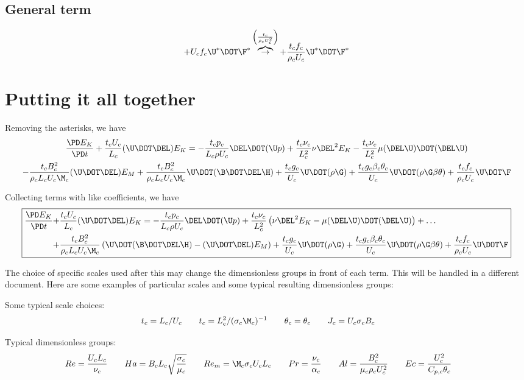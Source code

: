 \documentclass[11pt]{article}
\newcommand{\OB}{\overbrace{\rightarrow}^{\left(\frac{t_c}{\rho_c U_c^2}\right)}}
\begin{document}
\subsection{General term}
\begin{equation}
	+ U_c f_c \U^* \DOT \F^*
	\OB
	+ \frac{t_c f_c}{\rho_c U_c} \U^* \DOT \F^*
\end{equation}

\section{Putting it all together}
Removing the asterisks, we have
\begin{multline}
	\frac{\PD E_K}{\PD t}
	+ \frac{t_c U_c}{L_c} (\U \DOT \DEL) E_K
	= 
	- \frac{t_c p_c}{L_c \rho U_c} \DEL \DOT (\U p)
	+ \frac{t_c \nu_c}{L_c^2} \nu \DEL^2 E_K
	- \frac{t_c \nu_c}{L_c^2} \mu (\DEL \U) \DOT (\DEL \U)
	\\
	- \frac{t_c B_c^2}{\rho_c L_c U_c \M_c} (\U \DOT \DEL) E_M
	+ \frac{t_c B_c^2}{\rho_c L_c U_c \M_c} \U \DOT (\B \DOT \DEL \H)
	+ \frac{t_c g_c}{U_c} \U \DOT (\rho \G)
	+ \frac{t_c g_c \beta_c \theta_c}{U_c} \U \DOT (\rho \G \beta \theta)
	+ \frac{t_c f_c}{\rho_c U_c} \U \DOT \F
\end{multline}

Collecting terms with like coefficients, we have
\begin{equation}\boxed{\begin{aligned}
	\frac{\PD E_K}{\PD t}
	+ & \frac{t_c U_c}{L_c} (\U \DOT \DEL) E_K
	= 
	- \frac{t_c p_c}{L_c \rho U_c} \DEL \DOT (\U p)
	+ \frac{t_c \nu_c}{L_c^2}
	\left( \nu \DEL^2 E_K -  \mu (\DEL \U) \DOT (\DEL \U) \right) + \hdots
	\\
	+ & \frac{t_c B_c^2}{\rho_c L_c U_c \M_c}
	\left( \U \DOT (\B \DOT \DEL \H) - (\U \DOT \DEL) E_M \right)
	+ \frac{t_c g_c}{U_c} \U \DOT (\rho \G)
	+ \frac{t_c g_c \beta_c \theta_c}{U_c} \U \DOT (\rho \G \beta \theta)
	+ \frac{t_c f_c}{\rho_c U_c} \U \DOT \F
\end{aligned}}\end{equation}

The choice of specific scales used after this may change the dimensionless groups in front of each term. This will be handled in a different document. Here are some examples of particular scales and some typical resulting dimensionless groups:

Some typical scale choices:
\begin{equation}\begin{aligned}
	t_c = L_c/ U_c \qquad
	t_c = L_c^2/ (\sigma_c \M_c)^{-1} \qquad
	\theta_c = \theta_c \qquad
	J_c = U_c \sigma_c B_c \qquad
\end{aligned}\end{equation}

Typical dimensionless groups:
\begin{equation}
	Re = \frac{U_c L_c}{\nu_c} \qquad
	Ha = B_c L_c \sqrt{\frac{\sigma_c}{\mu_c}} \qquad
	Re_m = \M_c \sigma_c U_c L_c \qquad
	Pr = \frac{\nu_c}{\alpha_c} \qquad
	Al = \frac{B_c^2}{\mu_c \rho_c U_c^2} \qquad
	Ec = \frac{U_c^2}{C_{p,c} \theta_c} \qquad
\end{equation}
\end{document}
